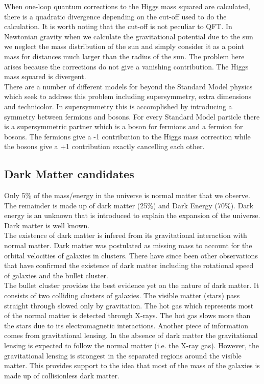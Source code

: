 When one-loop quantum corrections to the Higgs mass squared are calculated, 
there is a quadratic divergence depending on the cut-off used to do the
calculation. It is worth noting that the cut-off is not peculiar to QFT. In
Newtonian gravity when we calculate the gravitational potential due to the sun
we neglect the mass distribution of the sun and simply consider it as a point
mass for distances much larger than the radius of the sun. The problem here
arises because the corrections do not give a vanishing contribution. The Higgs
mass squared is divergent. \\

There are a number of different models for beyond the Standard Model physics 
which seek to address this problem including supersymmetry, extra dimensions 
and technicolor. In supersymmetry this is accomplished by introducing a symmetry
between fermions and bosons. For every Standard Model particle there is a 
supersymmetric partner which is a boson for fermions and a fermion for bosons. 
The fermions give a -1 contribution to the Higgs mass correction while the 
bosons give a +1 contribution exactly cancelling each other.

\subsection{Dark Matter candidates}

Only 5\% of the mass/energy in the universe is normal matter that we observe. 
The remainder is made up of dark matter (25\%) and Dark Energy (70\%). Dark
energy is an unknown that is introduced to explain the expansion of the
universe. Dark matter is well known. \\

The existence of dark matter is infered from its gravitational interaction with
normal matter. Dark matter was postulated as missing mass to account for the 
orbital velocities of galaxies in clusters. There have since been other 
observations that have confirmed the existence of dark matter including the 
rotational speed of galaxies and the bullet cluster. \\

The bullet cluster provides the best evidence yet on the nature of dark matter. 
It consists of two colliding clusters of galaxies. The visible matter (stars) 
pass straight through slowed only by gravitation. The hot gas which represents 
most of the normal matter is detected through X-rays. The hot gas slows more 
than the stars due to its electromagnetic interactions. Another piece of
information comes from gravitational lensing. In the absence of dark matter the
gravitational lensing is expected to follow the normal matter (i.e. the X-ray 
gas). However, the gravitational lensing is strongest in the separated regions
around the visible matter. This provides support to the idea that most of the 
mass of the galaxies is made up of collisionless dark matter. \\

